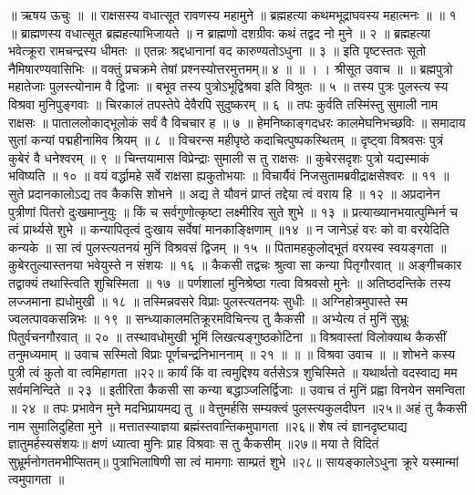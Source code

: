 ॥ ऋषय ऊचुः ॥ ॥
राक्षसस्य वधात्सूत रावणस्य महामुने ॥
ब्रह्महत्या कथमभूद्राघवस्य महात्मनः ॥ ॥ १ ॥
ब्राह्मणस्य वधात्सूत ब्रह्महत्याभिजायते ॥
न ब्राह्मणो दशग्रीवः कथं तद्वद नो मुने ॥ २ ॥
ब्रह्महत्या भवेत्क्रूरा रामचन्द्रस्य धीमतः ॥
एतन्नः श्रद्दधानानां वद कारुण्यतोऽधुना ॥ ३ ॥
इति पृष्टस्ततः सूतो नैमिषारण्यवासिभिः ॥
वक्तुं प्रचक्रमे तेषां प्रश्नस्योत्तरमुत्तमम्॥ ४ ॥ ॥ ।
। श्रीसूत उवाच ॥ ॥
ब्रह्मपुत्रो महातेजाः पुलस्त्योनाम वै द्विजाः ॥
बभूव तस्य पुत्रोऽभूद्विश्रवा इति विश्रुतः ॥ ५ ॥
तस्य पुत्रः पुलस्त्य स्य विश्रवा मुनिपुङ्गवाः ॥
चिरकालं तपस्तेपे देवैरपि सुदुष्करम् ॥ ६ ॥
तपः कुर्वति तस्मिंस्तु सुमाली नाम राक्षसः ॥
पाताललोकाद्भूलोकं सर्वं वै विचचार ह ॥ ७ ॥
हेमनिष्काङ्गदधरः कालमेघनिभच्छविः ॥
समादाय सुतां कन्यां पद्महीनामिव श्रियम् ॥ ८ ॥
विचरन्स महीपृष्ठे कदाचित्पुष्पकस्थितम् ॥
दृष्ट्वा विश्रवसः पुत्रं कुबेरं वै धनेश्वरम् ॥ ९ ॥
चिन्तयामास विप्रेन्द्राः सुमाली स तु राक्षसः ॥
कुबेरसदृशः पुत्रो यद्यस्माकं भविष्यति ॥ १० ॥
वयं वर्द्धामहे सर्वे राक्षसा ह्यकुतोभयाः ॥
विचार्यैवं निजसुतामब्रवीद्राक्षसेश्वरः ॥ ११ ॥
सुते प्रदानकालोऽद्य तव कैकसि शोभने ॥
अद्य ते यौवनं प्राप्तं तद्देया त्वं वराय हि ॥ १२ ॥
अप्रदानेन पुत्रीणां पितरो दुःखमाप्नुयुः ॥
किं च सर्वगुणोत्कृष्टा लक्ष्मीरिव सुते शुभे ॥ १३ ॥
प्रत्याख्यानभयात्पुम्भिर्न च त्वं प्रार्थ्यसे शुभे ॥
कन्यापितृत्वं दुःखाय सर्वेषां मानकाङ्क्षिणाम् ॥१४ ॥
न जानेऽहं वरः को वा वरयेदिति कन्यके ॥
सा त्वं पुलस्त्यतनयं मुनिं विश्रवसं द्विजम् ॥ १५ ॥
पितामहकुलोद्भूतं वरयस्व स्वयङ्गता ॥
कुबेरतुल्यास्तनया भवेयुस्ते न संशयः ॥ १६ ॥
कैकसी तद्वचः श्रुत्वा सा कन्या पितृगौरवात् ॥
अङ्गीचकार तद्वाक्यं तथास्त्विति शुचिस्मिता ॥ १७ ॥
पर्णशालां मुनिश्रेष्ठा गत्वा विश्रवसो मुनेः ॥
अतिष्ठदन्तिके तस्य लज्जमाना ह्यधोमुखी ॥ १८ ॥
तस्मिन्नवसरे विप्राः पुलस्त्यतनयः सुधीः ॥
अग्निहोत्रमुपास्ते स्म ज्वलत्पावकसन्निभः ॥ १९ ॥
सन्ध्याकालमतिक्रूरमविचिन्त्य तु कैकसी ॥
अभ्येत्य तं मुनिं सुभ्रूः पितुर्वचनगौरवात् ॥ २० ॥
तस्थावधोमुखी भूमिं लिखत्यङ्गुष्ठकोटिना ॥
विश्रवास्तां विलोक्याथ कैकसीं तनुमध्यमाम् ॥
उवाच सस्मितो विप्राः पूर्णचन्द्रनिभाननाम् ॥ २१ ॥ ॥
॥ विश्रवा उवाच ॥ ॥
शोभने कस्य पुत्री त्वं कुतो वा त्वमिहागता ॥२२॥
कार्यं किं वा त्वमुद्दिश्य वर्तसेऽत्र शुचिस्मिते ॥
यथार्थतो वदस्वाद्य मम सर्वमनिन्दिते ॥ २३ ॥
इतीरिता कैकसी सा कन्या बद्धाञ्जलिर्द्विजाः ॥
उवाच तं मुनिं प्रह्वा विनयेन समन्विता ॥ २४ ॥
तपः प्रभावेन मुने मदभिप्रायमद्य तु ॥
वेत्तुमर्हसि सम्यक्त्वं पुलस्त्यकुलदीपन ॥२५॥
अहं तु कैकसी नाम सुमालिदुहिता मुने ॥
मत्तातस्याज्ञया ब्रह्मंस्तवान्तिकमुपागता ॥२६॥
शेष त्वं ज्ञानदृष्ट्याद्य ज्ञातुमर्हस्यसंशयः॥
क्षणं ध्यात्वा मुनिः प्राह विश्रवाः स तु कैकसीम् ॥२७॥
मया ते विदितं सुभ्रूर्मनोगतमभीप्सितम्॥
पुत्राभिलाषिणी सा त्वं मामगाः साम्प्रतं शुभे ॥२८॥
सायङ्कालेऽधुना क्रूरे यस्मान्मां त्वमुपागता ॥
